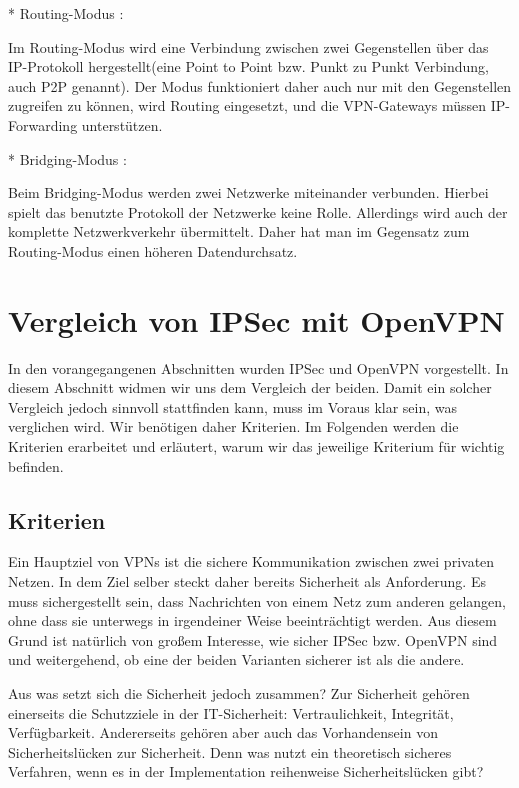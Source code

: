 \documentclass[12pt]{scrartcl}
\begin{document}
* Routing-Modus :

Im Routing-Modus wird eine Verbindung zwischen zwei Gegenstellen über das IP-Protokoll hergestellt(eine Point to Point bzw. Punkt zu Punkt Verbindung, auch P2P genannt). Der  Modus funktioniert daher auch nur mit den Gegenstellen zugreifen zu können, wird Routing eingesetzt, und die VPN-Gateways müssen IP-Forwarding unterstützen.

* Bridging-Modus : 

Beim Bridging-Modus werden zwei Netzwerke miteinander verbunden. Hierbei spielt das benutzte Protokoll der Netzwerke keine Rolle. Allerdings wird auch der komplette Netzwerkverkehr übermittelt. Daher hat man im Gegensatz zum Routing-Modus einen höheren Datendurchsatz.




\section{Vergleich von IPSec mit OpenVPN}

In den vorangegangenen Abschnitten wurden IPSec und OpenVPN vorgestellt. In diesem Abschnitt widmen wir uns dem Vergleich der beiden. Damit ein solcher Vergleich jedoch sinnvoll stattfinden kann, muss im Voraus klar sein, was verglichen wird. Wir benötigen daher Kriterien. Im Folgenden werden die Kriterien erarbeitet und erläutert, warum wir das jeweilige Kriterium für wichtig befinden.

\subsection{Kriterien}
Ein Hauptziel von VPNs ist die sichere Kommunikation zwischen zwei privaten Netzen. In dem Ziel selber steckt daher bereits Sicherheit als Anforderung. Es muss sichergestellt sein, dass Nachrichten von einem Netz zum anderen gelangen, ohne dass sie unterwegs in irgendeiner Weise beeinträchtigt werden. Aus diesem Grund ist natürlich von großem Interesse, wie sicher IPSec bzw. OpenVPN sind und weitergehend, ob eine der beiden Varianten sicherer ist als die andere.

Aus was setzt sich die Sicherheit jedoch zusammen? Zur Sicherheit gehören einerseits die Schutzziele in der IT-Sicherheit: Vertraulichkeit, Integrität, Verfügbarkeit. Andererseits gehören aber auch das Vorhandensein von Sicherheitslücken zur Sicherheit. Denn was nutzt ein theoretisch sicheres Verfahren, wenn es in der Implementation reihenweise Sicherheitslücken gibt?
\end{document}
